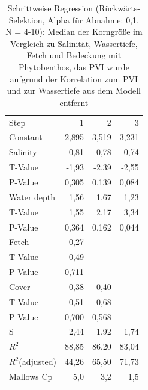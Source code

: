 \begin{table}[!htb]
\centering
\caption[Schrittweise Regression: Organischer Gehalt der Sedimente im Vergleich zu 4 Prädikatoren]{Schrittweise Regression (Rückwärts-Selektion, Alpha für Abnahme: 0,1, N = 4-10): Median der Korngröße im Vergleich zu Salinität, Wassertiefe, Fetch und Bedeckung mit Phytobenthos, das PVI  wurde aufgrund der Korrelation zum PVI und zur Wassertiefe aus dem Modell entfernt}
\begin{tabular}{lrrr}
\toprule
Step      	&     1  &    2     & 		3\\
Constant   	& 2,895  &	3,519  	&	3,231\\
\midrule
Salinity         & -0,81  &	-0,78  	&	-0,74\\
T-Value     & -1,93  &	-2,39  	&	-2,55\\
P-Value     & 0,305  &	0,139  	&	0,084\\
\midrule
Water depth       & 1,56   &	1,67   	&	1,23\\
T-Value     & 1,55   &	2,17   	&	3,34\\
P-Value     &0,364  &	0,162  	&	0,044\\
\midrule
Fetch       &   0,27\\
T-Value    &  0,49\\
P-Value    & 0,711\\
\midrule
Cover      &   -0,38  &	-0,40\\
T-Value   &  -0,51  &	-0,68\\
P-Value   &  0,700  &	0,568\\
\midrule
\midrule
S        &    2,44   &	1,92   	&	1,74\\
$R^2$      &  88,85  &	86,20  	&	83,04\\
$R^2$(adjusted) &  44,26  &	65,50  	&	71,73\\
Mallows Cp  &  5,0  &  	3,2    	&	1,5 \\
\bottomrule
\end{tabular}
\label{tab:spearman_rank_correlations}
\end{table}








   